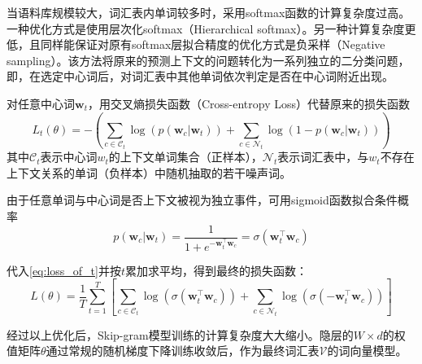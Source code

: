 当语料库规模较大，词汇表内单词较多时，采用softmax函数的计算复杂度过高。一种优化方式是使用层次化softmax（Hierarchical softmax）\cite{Hierarchical_softmax}。另一种计算复杂度更低，且同样能保证对原有softmax层拟合精度的优化方式是负采样（Negative sampling）。该方法将原来的预测上下文的问题转化为一系列独立的二分类问题，即，在选定中心词后，对词汇表中其他单词依次判定是否在中心词附近出现。


对任意中心词$\mathbf{w}_t$，用交叉熵损失函数（Cross-entropy Loss）代替原来的损失函数
\begin{equation}
    \label{eq:loss_of_t}
    L_t(\theta) = -\left( 
        \sum_{c \in \mathcal{C}_t} \log(p(\mathbf{w}_c | \mathbf{w}_t))+\sum_{c \in \mathcal{N}_t} \log(1-p(\mathbf{w}_c | \mathbf{w}_t)) 
    \right)
\end{equation}
其中$\mathcal{C}_t$表示中心词$w_t$的上下文单词集合（正样本），$\mathcal{N}_t$表示词汇表中，与$w_t$不存在上下文关系的单词（负样本）中随机抽取的若干噪声词。

由于任意单词与中心词是否上下文被视为独立事件，可用sigmoid函数拟合条件概率
\begin{equation}
    p(\mathbf{w}_c | \mathbf{w}_t) = \frac{1}{1+e^{-\mathbf{w}_t^{\top} \mathbf{w}_c}} = \sigma(\mathbf{w}_t^{\top} \mathbf{w}_c)
\end{equation}

代入\ref{eq:loss_of_t}并按$t$累加求平均，得到最终的损失函数：
\begin{equation}
    L(\theta) = \frac{1}{T}\sum_{t=1}^{T} \left[
        \sum_{c \in \mathcal{C}_t} \log(\sigma(\mathbf{w}_t^{\top} \mathbf{w}_c)) + \sum_{c \in \mathcal{N}_t} \log(\sigma(-\mathbf{w}_t^{\top} \mathbf{w}_c))
    \right]
\end{equation}


%
%

经过以上优化后，Skip-gram模型训练的计算复杂度大大缩小。隐层的$W\times d$的权值矩阵$\theta$通过常规的随机梯度下降训练收敛后，作为最终词汇表$\mathcal{V}$的词向量模型。

